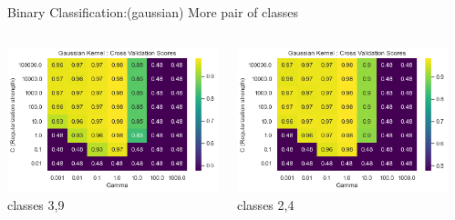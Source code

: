 \documentclass[12pt,t]{beamer}
\begin{document}
\begin{frame}[t]{Binary Classification:(gaussian) More pair of classes}
    \scriptsize
    \begin{columns}
        \begin{column}[]{0.33\linewidth}
            \includegraphics[width=\linewidth]{images/p1a/2(binary clf)/classes3and9_libsvm_rbf25f.png}
            \centering classes 3,9
        \end{column}
        \begin{column}[]{0.33\linewidth}
            \includegraphics[width=\linewidth]{images/p1a/2(binary clf)/classes2and4_libsvm_rbf25f.png}
            \centering classes 2,4
        \end{column}
        \begin{column}[]{0.33\linewidth}

\end{column}
\end{columns}
\end{frame}
\end{document}
